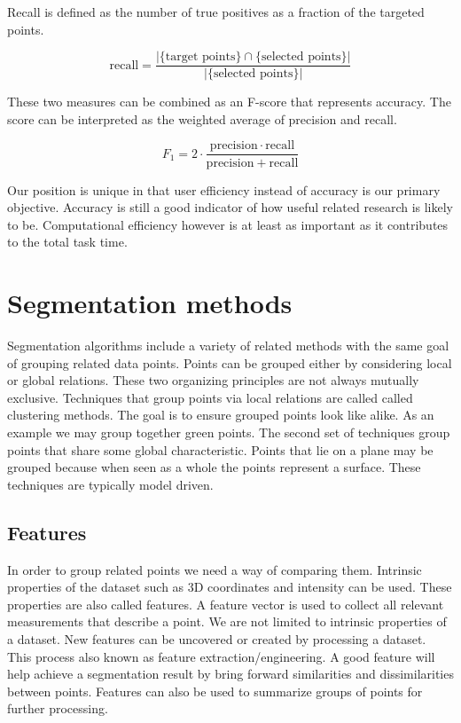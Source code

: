 Recall is defined as the number of true positives as a fraction of the targeted points.

\begin{equation} \label{eq:recall}
	\text{recall}=\frac{|\{\text{target points}\}\cap\{\text{selected points}\}|}{|\{\text{selected points}\}|}
\end{equation}

These two measures can be combined as an F-score that represents accuracy. The score can be interpreted as the weighted average of precision and recall.

\begin{equation} \label{eq:f1score}
	F_1 = 2 \cdot \frac{\mathrm{precision} \cdot \mathrm{recall}}{\mathrm{precision} + \mathrm{recall}}
\end{equation}

Our position is unique in that user efficiency instead of accuracy is our primary objective. Accuracy is still a good indicator of how useful related research is likely to be. Computational efficiency however is at least as important as it contributes to the total task time.


\section{Segmentation methods}

Segmentation algorithms include a variety of related methods with the same goal of grouping related data points. Points can be grouped either by considering local or global relations. These two organizing principles are not always mutually exclusive. Techniques that group points via local relations are called called clustering methods. The goal is to ensure grouped points look like alike. As an example we may group together green points. The second set of techniques group points that share some global characteristic. Points that lie on a plane may be grouped because when seen as a whole the points represent a surface. These techniques are typically model driven.

\subsection{Features}

In order to group related points we need a way of comparing them. Intrinsic properties of the dataset such as 3D coordinates and intensity can be used. These properties are also called features. A feature vector is used to collect all relevant measurements that describe a point. We are not limited to intrinsic properties of a dataset. New features can be uncovered or created by processing a dataset. This process also known as feature extraction/engineering. A good feature will help achieve a segmentation result by bring forward similarities and dissimilarities between points. Features can also be used to summarize groups of points for further processing.


